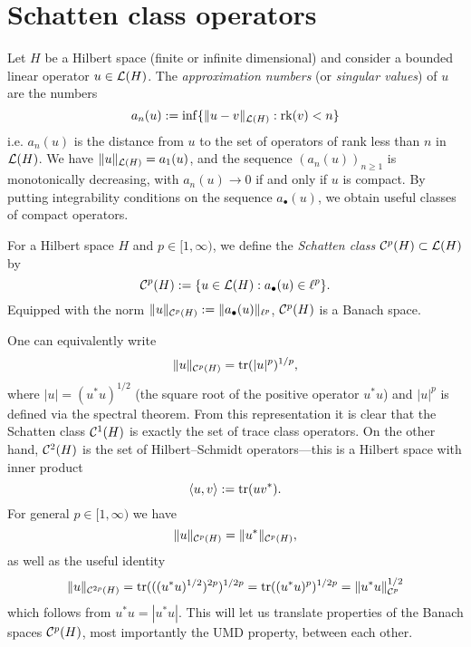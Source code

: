 \section{Schatten class operators}
Let $H$ be a Hilbert space (finite or infinite dimensional) and consider a bounded linear operator $u \in \mathcal{L}(H)$.
The \emph{approximation numbers} (or \emph{singular values}) of $u$ are the numbers
\begin{equation*}
  a_{n}(u) := \inf\{\|u - v\|_{\mathcal{L}(H)} : \mathrm{rk}(v) < n\}
\end{equation*}
i.e. $a_{n}(u)$ is the distance from $u$ to the set of operators of rank less than $n$ in $\mathcal{L}(H)$.
We have $\|u\|_{\mathcal{L}(H)} = a_{1}(u)$, and the sequence $(a_{n}(u))_{n \geq 1}$ is monotonically decreasing, with $a_{n}(u) \to 0$ if and only if $u$ is compact.
By putting integrability conditions on the sequence $a_{\bullet}(u)$, we obtain useful classes of compact operators.

\begin{defn}
  For a Hilbert space $H$ and $p \in [1,\infty)$, we define the \emph{Schatten class} $\mathcal{C}^{p}(H) \subset \mathcal{L}(H)$ by
  \begin{equation*}
    \mathcal{C}^{p}(H) := \{u \in \mathcal{L}(H) : a_{\bullet}(u) \in \ell^{p}\}.
  \end{equation*}
  Equipped with the norm $\|u\|_{\mathcal{C}^{p}(H)} := \|a_{\bullet}(u)\|_{\ell^{p}}$, $\mathcal{C}^{p}(H)$ is a Banach space.
\end{defn}

One can equivalently write
\begin{equation*}
  \|u\|_{\mathcal{C}^{p}(H)} = \operatorname{tr}(|u|^{p})^{1/p},
\end{equation*}
where $|u| = (u^{*}u)^{1/2}$ (the square root of the positive operator $u^{*} u$) and $|u|^{p}$ is defined via the spectral theorem.
From this representation it is clear that the Schatten class $\mathcal{C}^{1}(H)$ is exactly the set of trace class operators.
On the other hand, $\mathcal{C}^{2}(H)$ is the set of Hilbert--Schmidt operators---this is a Hilbert space with inner product
\begin{equation*}
  \langle u, v \rangle := \operatorname{tr}(uv^*).
\end{equation*}
For general $p \in [1,\infty)$ we have
\begin{equation*}
  \|u\|_{\mathcal{C}^{p}(H)} = \|u^* \|_{\mathcal{C}^{p}(H)},
\end{equation*}
as well as the useful identity
\begin{equation}\label{eq:Schatten-convexity}
  \|u\|_{\mathcal{C}^{2p}(H)} = \operatorname{tr}(((u^*u)^{1/2})^{2p})^{1/2p} = \operatorname{tr}((u^* u)^{p})^{1/2p} = \|u^* u\|_{\mathcal{C}^{p}}^{1/2}
\end{equation}
which follows from $u^{*} u = |u^{*} u|$.
This will let us translate properties of the Banach spaces $\mathcal{C}^{p}(H)$, most importantly the UMD property, between each other.



